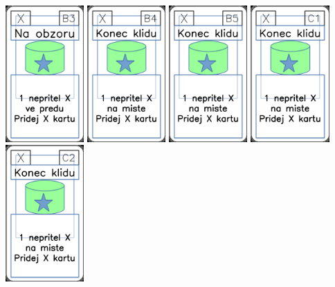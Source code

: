 \documentclass[a4paper]{article}
\begin{document}
	\includegraphics[width=3.0cm]{img-5_7}
	\includegraphics[width=3.0cm]{img-5_8}
	\includegraphics[width=3.0cm]{img-5_9}
	\includegraphics[width=3.0cm]{img-5_10}
	\includegraphics[width=3.0cm]{img-5_11}
\end{document}

